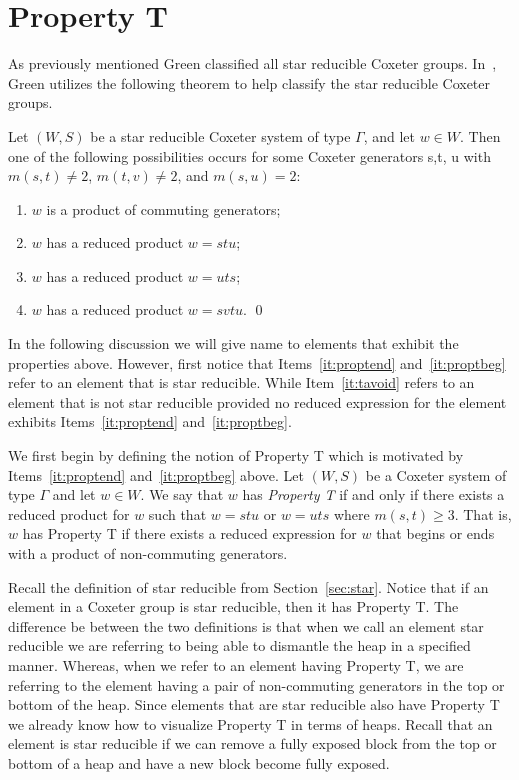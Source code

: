
\section{Property T}\label{Tavoid}

As previously mentioned Green classified all star reducible Coxeter groups. In~\cite{Green2006a}, Green utilizes the following theorem to help classify the star reducible Coxeter groups. 
\begin{theorem}\label{thm:starred}
	Let $(W,S)$ be a star reducible Coxeter system of type $\Gamma$, and let $w \in W$. Then one of the following possibilities occurs for some Coxeter generators s,t, u with $m(s,t) \neq 2$, $m(t,v) \neq 2$, and $m(s,u)=2$:
	\begin{enumerate}
	\item $w$ is a product of commuting generators;\label{it:triv}
	\item $w$ has a reduced product $w=stu$;\label{it:proptend}
	\item $w$ has a reduced product $w=uts$;\label{it:proptbeg}
	\item $w$ has a reduced product $w=svtu$.\label{it:tavoid}	\qed
	\end{enumerate}
\end{theorem}

In the following discussion we will give name to elements that exhibit the properties above. However, first notice that Items~\ref{it:proptend} and~\ref{it:proptbeg} refer to an element that is star reducible. While Item~\ref{it:tavoid} refers to an element that is not star reducible provided no reduced expression for the element exhibits Items~\ref{it:proptend} and~\ref{it:proptbeg}.

We first begin by defining the notion of Property T which is motivated by Items~\ref{it:proptend} and~\ref{it:proptbeg} above. Let $(W,S)$ be a Coxeter system of type $\Gamma$ and let $w \in W$. We say that $w$ has \emph{Property T} if and only if there exists a reduced product for $w$ such that $w=stu$ or $w=uts$ where $m(s,t)\geq 3$. That is, $w$ has Property T if there exists a reduced expression for $w$ that begins or ends with a product of non-commuting generators.

Recall the definition of star reducible from Section~\ref{sec:star}. Notice that if an element in a Coxeter group is star reducible, then it has Property T. The difference be between the two definitions is that when we call an element star reducible we are referring to being able to dismantle the heap in a specified manner. Whereas, when we refer to an element having Property T, we are referring to the element having a pair of non-commuting generators in the top or bottom of the heap. Since elements that are star reducible also have Property T we already know how to visualize Property T in terms of heaps. Recall that an element is star reducible if we can remove a fully exposed block from the top or bottom of a heap and have a new block become fully exposed. 

